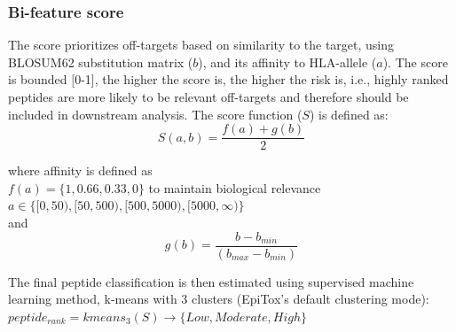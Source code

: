 \documentclass[unnumsec,webpdf,contemporary,large]{oup-authoring-template}%
\theoremstyle{thmstyleone}%
\theoremstyle{thmstyletwo}%
\theoremstyle{thmstylethree}%
\begin{document}
        \subsubsection{\textbf{Bi-feature score}}\label{sec:annotopes_bi}
        The score prioritizes off-targets based on similarity to the target, using BLOSUM62 substitution matrix ($b$), and its affinity to HLA-allele ($a$). The score is bounded [0-1], the higher the score is, the higher the risk is, i.e., highly ranked peptides are more likely to be relevant off-targets and therefore should be included in downstream analysis. 
        The score function ($S$) is defined as:
        \begin{equation}
            S(a,b)=  \frac{f(a)+g(b)}{2}
        \end{equation}

        where affinity is defined as \\
        $f(a)= \{1,0.66,0.33,0\}$ to maintain biological relevance  \\
        $a \in \{[0,50),[50,500),[500,5000),[5000,\infty)\}$ \\
        and
        \begin{equation}
            g(b)=  \frac{b- b_{min}}{(b_{max}-b_{min})} 
        \end{equation}

        The final peptide classification is then estimated using supervised machine learning method, k-means with 3 clusters (EpiTox’s default clustering mode): $peptide_{rank}= kmeans_3(S) \rightarrow\{Low,Moderate,High\}$
        
\end{document}
